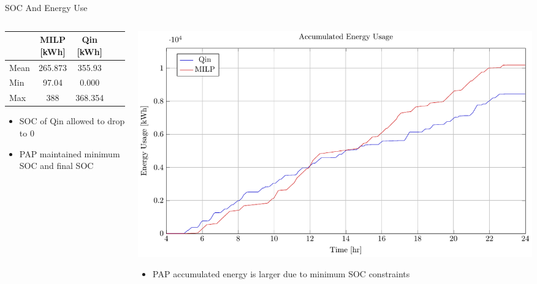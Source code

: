 \documentclass[aspectratio=169,dvipsnames]{beamer}
\begin{document}
\begin{frame}[label={sec:org3386ee9}]{SOC And Energy Use}
\begin{columns}
\begin{column}{0.5\columnwidth}
\begin{center}
\begin{tabular}{l|cccc}
\hline
 & MILP [kWh] & Qin [kWh]\\[0pt]
\hline
Mean & 265.873 & 355.93\\[0pt]
Min & 97.04 & 0.000\\[0pt]
Max & 388 & 368.354\\[0pt]
\hline
\end{tabular}
\end{center}

\begin{itemize}
\item SOC of Qin allowed to drop to 0
\item PAP maintained minimum SOC and final SOC
\end{itemize}
\end{column}

\begin{column}{0.5\columnwidth}
\begin{center}
\includegraphics[width=\textwidth]{./img/milp-pap/energy-milp-pap.pdf}
\end{center}

\begin{itemize}
\item PAP accumulated energy is larger due to minimum SOC constraints
\end{itemize}
\end{column}
\end{columns}
\end{frame}
\end{document}
